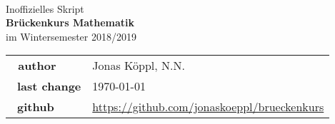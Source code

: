 \documentclass{report}
\theoremstyle{changebreak} %
\numberwithin{theorem}{chapter}
\numberwithin{theorem}{chapter}
\numberwithin{theorem}{chapter}
\numberwithin{theorem}{chapter}
\numberwithin{theorem}{chapter}
\numberwithin{theorem}{chapter}
\begin{document}
\begin{titlepage}
    \ \newline\newline\newline\newline\newline

  \begin{center}

  \huge Inoffizielles Skript\\
  \Huge\textbf{Brückenkurs Mathematik}\\
  \huge im Wintersemester 2018/2019\\
  \normalsize

  \vspace{1cm}
  \begin{tabular}[b]{l|l}
  \textbf{\ author}      & Jonas Köppl, N.N.\\\
            \textbf{last change}   & \today\\\
            \textbf{github}        & \url{https://github.com/jonaskoeppl/brueckenkurs}
  \end{tabular}
  \vspace{1cm}

  \end{center}

\end{titlepage}

\tableofcontents







\end{document}
